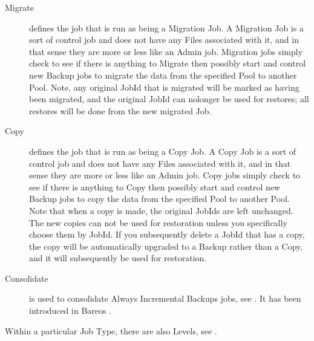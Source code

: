 {\begin{description}
\item [Migrate]
   defines the job that is run as being a
   Migration Job.  A Migration Job is a sort of control job and does not have
   any Files associated with it, and in that sense they are more or less like
   an Admin job.  Migration jobs simply check to see if there is anything to
   Migrate then possibly start and control new Backup jobs to migrate the data
   from the specified Pool to another Pool.  Note, any original JobId that
   is migrated will be marked as having been migrated, and the original
   JobId can nolonger be used for restores; all restores will be done from
   the new migrated Job.

\item [Copy]
   defines the job that is run as being a
   Copy Job.  A Copy Job is a sort of control job and does not have
   any Files associated with it, and in that sense they are more or less like
   an Admin job.  Copy jobs simply check to see if there is anything to
   Copy then possibly start and control new Backup jobs to copy the data
   from the specified Pool to another Pool.  Note that when a copy is
   made, the original JobIds are left unchanged. The new copies can not
   be used for restoration unless you specifically choose them by JobId.
   If you subsequently delete a JobId that has a copy, the copy will be
   automatically upgraded to a Backup rather than a Copy, and it will
   subsequently be used for restoration.

\item [Consolidate]
    is used to consolidate Always Incremental Backups jobs, see .
    It has been introduced in Bareos .
\end{description}

Within a particular Job Type, there are also Levels,
see .
}



